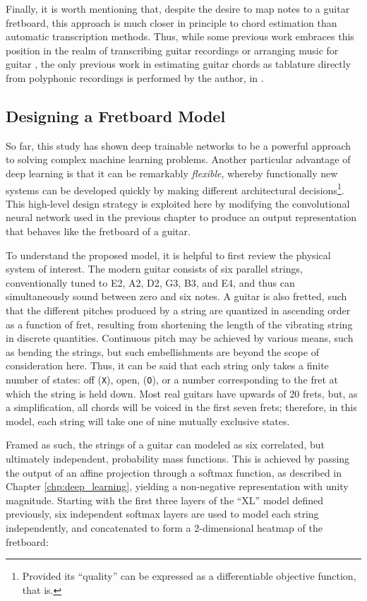 Finally, it is worth mentioning that, despite the desire to map notes to a guitar fretboard, this approach is much closer in principle to chord estimation than automatic transcription methods.
Thus, while some previous work embraces this position in the realm of transcribing guitar recordings \cite{Barbancho2012Automatic} or arranging music for guitar \cite{Hori2013Input}, the only previous work in estimating guitar chords as tablature directly from polyphonic recordings is performed by the author, in \cite{Humphrey2014Music}.


\subsection{Designing a Fretboard Model}
\label{subsec:design}

So far, this study has shown deep trainable networks to be a powerful approach to solving complex machine learning problems.
Another particular advantage of deep learning is that it can be remarkably \emph{flexible}, whereby functionally new systems can be developed quickly by making different architectural decisions\footnote{
Provided its ``quality'' can be expressed as a differentiable objective function, that is.}.
This high-level design strategy is exploited here by modifying the convolutional neural network used in the previous chapter to produce an output representation that behaves like the fretboard of a guitar.

To understand the proposed model, it is helpful to first review the physical system of interest.
The modern guitar consists of six parallel strings, conventionally tuned to E2, A2, D2, G3, B3, and E4, and thus can simultaneously sound between zero and six notes.
A guitar is also fretted, such that the different pitches produced by a string are quantized in ascending order as a function of fret, resulting from shortening the length of the vibrating string in discrete quantities.
Continuous pitch may be achieved by various means, such as bending the strings, but such embellishments are beyond the scope of consideration here.
Thus, it can be said that each string only takes a finite number of states: off (\texttt{X}), open, (\texttt{O}), or a number corresponding to the fret at which the string is held down.
Most real guitars have upwards of 20 frets, but, as a simplification, all chords will be voiced in the first seven frets;
therefore, in this model, each string will take one of nine mutually exclusive states.

Framed as such, the strings of a guitar can modeled as six correlated, but ultimately independent, probability mass functions.
This is achieved by passing the output of an affine projection through a softmax function, as described in Chapter \ref{chp:deep_learning}, yielding a non-negative representation with unity magnitude.
Starting with the first three layers of the ``XL'' model defined previously, six independent softmax layers are used to model each string independently, and concatenated to form a 2-dimensional heatmap of the fretboard:

